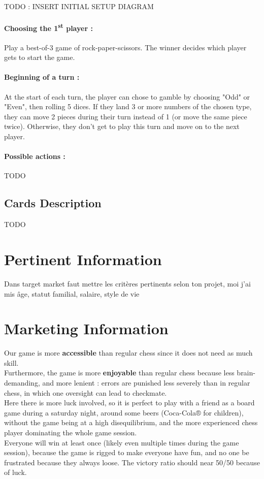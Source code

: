 \documentclass[12pt]{article}
\begin{document}
            \paragraph{}
                \centerline{TODO : INSERT INITIAL SETUP DIAGRAM}
            \paragraph{Choosing the 1\textsuperscript{st} player :\\}
                Play a best-of-3 game of rock-paper-scissors. The winner decides which player gets to start the game.
            \paragraph{Beginning of a turn :\\}
                At the start of each turn, the player can chose to gamble by choosing "Odd" or "Even", then rolling 5 dices. If they land 3 or more numbers of the chosen type, they can move 2 pieces during their turn instead of 1 (or move the same piece twice). Otherwise, they don't get to play this turn and move on to the next player.
            \paragraph{Possible actions :\\}
                TODO
        \subsection{Cards Description}
            TODO
    
    \section{Pertinent Information}
        Dans target market faut mettre les critères pertinents selon ton projet, moi j'ai mis âge, statut familial, salaire, style de vie
    
    \section{Marketing Information}
        Our game is more \textbf{accessible} than regular chess since it does not need as much skill.
        \\Furthermore, the game is more \textbf{enjoyable} than regular chess because less brain-demanding, and more lenient : errors are punished less severely than in regular chess, in which one oversight can lead to checkmate.
        \\Here there is more luck involved, so it is perfect to play with a friend as a board game during a saturday night, around some beers (Coca-Cola® for children), without the game being at a high disequilibrium, and the more experienced chess player dominating the whole game session.
        \\Everyone will win at least once (likely even multiple times during the game session), because the game is rigged to make everyone have fun, and no one be frustrated because they always loose. The victory ratio should near 50/50 because of luck.
\end{document}
